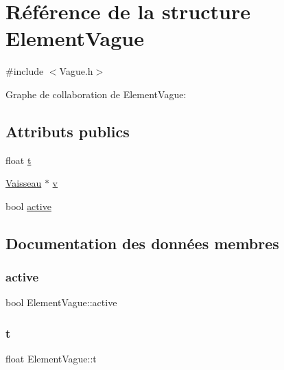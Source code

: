 \hypertarget{struct_element_vague}{}\section{Référence de la structure Element\+Vague}
\label{struct_element_vague}


{\ttfamily \#include $<$Vague.\+h$>$}



Graphe de collaboration de Element\+Vague\+:
\subsection*{Attributs publics}
\begin{DoxyCompactItemize}
\item 
float \hyperlink{struct_element_vague_af6645ffc5fbc3be59dbf5063a78f8e36}{t}
\item 
\hyperlink{class_vaisseau}{Vaisseau} $\ast$ \hyperlink{struct_element_vague_a74ef9460cb2ccf37f07caa28b48959ec}{v}
\item 
bool \hyperlink{struct_element_vague_ab0bd206a38ece486f6f5bb9ec76ff36b}{active}
\end{DoxyCompactItemize}


\subsection{Documentation des données membres}
\mbox{\label{struct_element_vague_ab0bd206a38ece486f6f5bb9ec76ff36b}} 
\subsubsection{\texorpdfstring{active}{active}}
{\footnotesize\ttfamily bool Element\+Vague\+::active}

\mbox{\label{struct_element_vague_af6645ffc5fbc3be59dbf5063a78f8e36}} 
\subsubsection{\texorpdfstring{t}{t}}
{\footnotesize\ttfamily float Element\+Vague\+::t}

\mbox{\label{struct_element_vague_a74ef9460cb2ccf37f07caa28b48959ec}} 
